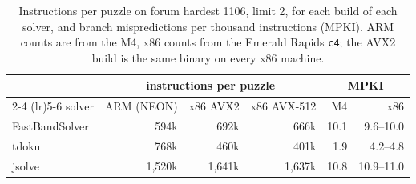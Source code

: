 \documentclass[11pt]{article}
\theoremstyle{definition}
\theoremstyle{plain}
\begin{document}
\begin{table}[t]
\centering
\caption{Instructions per puzzle on forum hardest 1106, limit 2, for each build of each solver, and branch
mispredictions per thousand instructions (MPKI). ARM counts are from the M4, x86 counts from the Emerald Rapids
\texttt{c4}; the AVX2 build is the same binary on every x86 machine.}
\label{tab:instructions}
\small
\begin{tabular}{lrrrrr}
\toprule
& \multicolumn{3}{c}{instructions per puzzle} & \multicolumn{2}{c}{MPKI} \\
\cmidrule(lr){2-4} \cmidrule(lr){5-6}
solver & ARM (NEON) & x86 AVX2 & x86 AVX-512 & M4 & x86 \\
\midrule
FastBandSolver & 594k & 692k & 666k & 10.1 & 9.6--10.0 \\
tdoku & 768k & 460k & 401k & 1.9 & 4.2--4.8 \\
jsolve & 1{,}520k & 1{,}641k & 1{,}637k & 10.8 & 10.9--11.0 \\
\bottomrule
\end{tabular}
\end{table}
\end{document}
